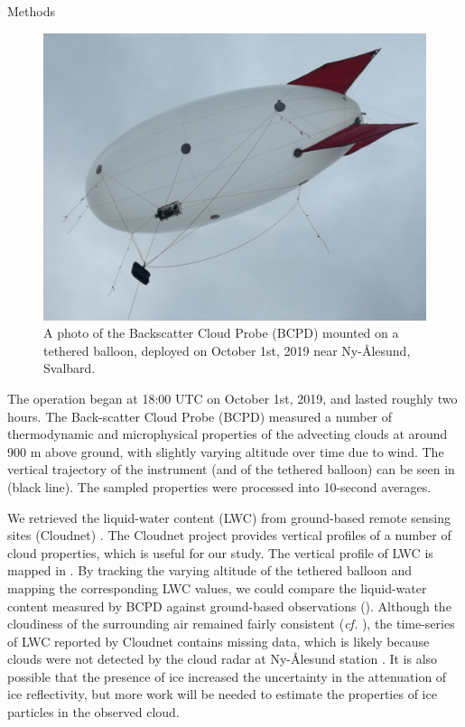 \documentclass[final]{beamer}
\newlength{\colwidth}
\begin{document}
\begin{frame}[t]
\begin{columns}[t]
\begin{column}{\colwidth}
\begin{block}{Methods}
        \begin{figure}
          \centering
          \includegraphics[width=0.8\colwidth]{figure/balloon.png}
          \caption{A photo of the Backscatter Cloud Probe (BCPD) mounted on a tethered balloon, deployed on October 1st, 2019 near Ny-\r{A}lesund, Svalbard.}
          \label{fig:01}
        \end{figure}
        
        The operation began at 18:00 UTC on October 1st, 2019, and lasted roughly two hours. The Back-scatter Cloud Probe (BCPD) measured a number of thermodynamic and microphysical properties of the advecting clouds at around 900 m above ground, with slightly varying altitude over time due to wind. The vertical trajectory of the instrument (and of the tethered balloon) can be seen in  (black line). The sampled properties were processed into 10-second averages.

        We retrieved the liquid-water content (LWC) from ground-based remote sensing sites (Cloudnet) \cite{illingworth2007cloudnet}. The Cloudnet project provides vertical profiles of a number of cloud properties, which is useful for our study. The vertical profile of LWC is mapped in . By tracking the varying altitude of the tethered balloon and mapping the corresponding LWC values, we could compare the liquid-water content measured by BCPD against ground-based observations (). Although the cloudiness of the surrounding air remained fairly consistent (\emph{cf.} ), the time-series of LWC reported by Cloudnet contains missing data, which is likely because clouds were not detected by the cloud radar at Ny-\r{A}lesund station \cite{illingworth2007cloudnet}. It is also possible that the presence of ice increased the uncertainty in the attenuation of ice reflectivity, but more work will be needed to estimate the properties of ice particles in the observed cloud.
        

\end{block}
\end{column}
\end{columns}
\end{frame}
\end{document}
